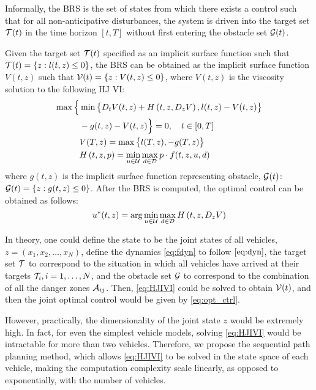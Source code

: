 Informally, the BRS is the set of states from which there exists a control such that for all non-anticipative disturbances, the system is driven into the target set $\mathcal{T}(t)$ in the time horizon $[t, T]$ without first entering the obstacle set $\mathcal{G}(t)$.

Given the target set $\mathcal{T}(t)$ specified as an implicit surface function such that $\mathcal{T}(t) = \{z: l(t, z) \le 0\}$, the BRS can be obtained as the implicit surface function $V(t, z)$ such that $\mathcal{V}(t) = \{z: V(t, z) \le 0\}$, where $V(t, z)$ is the viscosity solution \cite{Crandall83} to the following HJ VI:
%
\begin{equation}
\label{eq:HJIVI}
\begin{aligned}
\max\Big\{&\min\big\{D_t V(t, z) + H\left(t, z, D_z V\right), l(t,z) - V(t, z)\big\}\\
& -g(t, z) - V(t, z)\Big\} = 0, \quad t\in[0,T]\\
&V(T, z) = \max\big\{l(T, z), -g(T, z)\big\} \\ 
&H\left(t, z, p\right) = \min_{u \in \mathcal{U}} \max_{d \in \mathcal{D}} p \cdot f(t, z, u, d)
\end{aligned}
\end{equation}
%
\noindent where $g(t, z)$ is the implicit surface function representing obstacle, $\mathcal{G}(t)$: $\mathcal{G}(t) = \{z: g(t, z) \le 0\}$. After the BRS is computed, the optimal control can be obtained as follows:
%
\begin{equation}
\label{eq:opt_ctrl}
u^*(t, z) = \arg \min_{u \in \mathcal{U}} \max_{d \in \mathcal{D}} H\left(t, z, D_z V\right)
\end{equation}

In theory, one could define the state to be the joint states of all vehicles, $z = (x_1, x_2, \ldots, x_N)$, define the dynamics \eqref{eq:fdyn} to follow $\eqref{eq:dyn}$, the target set $\mathcal{T}$ to correspond to the situation in which all vehicles have arrived at their targets $\mathcal{T}_i, i = 1, \ldots, N$, and the obstacle set $\mathcal{G}$ to correspond to the combination of all the danger zones $\mathcal{A}_{ij}$. Then, \eqref{eq:HJIVI} could be solved to obtain $\mathcal{V}(t)$, and then the joint optimal control would be given by \eqref{eq:opt_ctrl}.

However, practically, the dimensionality of the joint state $z$ would be extremely high. In fact, for even the simplest vehicle models, solving \eqref{eq:HJIVI} would be intractable for more than two vehicles. Therefore, we propose  the sequential path planning method, which allows \eqref{eq:HJIVI} to be solved in the state space of each vehicle, making the computation complexity scale linearly, as opposed to exponentially, with the number of vehicles.

